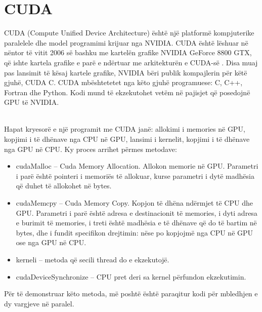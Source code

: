 \chapter{CUDA}


CUDA (Compute Unified Device Architecture) është një platformë kompjuterike paralelele dhe model programimi krijuar nga NVIDIA. CUDA është lëshuar në nëntor të vitit 2006 së bashku me kartelën grafike NVIDIA GeForce 8800 GTX, që ishte kartela grafike e parë e ndërtuar me arkitekturën e CUDA-së \cite{cuda_by_example}. Disa muaj pas lansimit të kësaj kartele grafike, NVIDIA bëri publik kompajlerin për këtë gjuhë, CUDA C. CUDA mbështetetet nga këto gjuhë programuese: C, C++, Fortran dhe Python. Kodi mund të ekzekutohet vetëm në pajisjet që posedojnë GPU të NVIDIA. 

\noindent \\ Hapat kryesorë e një programit me CUDA janë: allokimi i memories në GPU, kopjimi i të dhënave nga CPU në GPU, lansimi i kernelit, kopjimi i të dhënave nga GPU në CPU. Ky proces arrihet përmes metodave:	

\begin{itemize}
  \item cudaMalloc – Cuda Memory Allocation. Allokon memorie në GPU. Parametri i parë është pointeri i memoriës të allokuar, kurse parametri i dytë madhësia që duhet të allokohet në bytes. 
  \item 	cudaMemcpy – Cuda Memory Copy. Kopjon të dhëna ndërmjet të CPU dhe GPU. Parametri i parë është adresa e destinacionit të memories, i dyti adresa e burimit të memories, i treti është  madhësia e të dhënave që do të bartim në bytes, dhe i fundit specifikon drejtimin: nëse po kopjojmë nga CPU në GPU ose nga GPU në CPU.
  \item kerneli – metoda që secili thread do e ekzekutojë.
  \item cudaDeviceSynchronize – CPU pret deri sa kernel përfundon ekzekutimin.
\end{itemize}

\noindent Për të demonstruar këto metoda, më poshtë është paraqitur kodi për mbledhjen e dy vargjeve në paralel. \\


